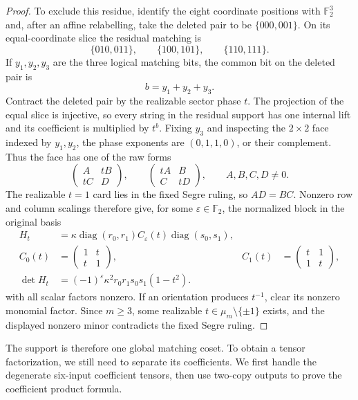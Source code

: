 \documentclass[11pt,letterpaper,onecolumn]{article}
\theoremstyle{plain}
\theoremstyle{definition}
\theoremstyle{remark}
\newcommand{\Ftwo}{\mathbb F_2}
\newcommand{\diag}{\operatorname{diag}}
\begin{document}
\begin{proof}
To exclude this residue, identify the eight coordinate positions with
\(\Ftwo^3\) and, after an affine relabelling, take the deleted pair to be
\(\{000,001\}\).  On its equal-coordinate slice the residual matching is
\[
 \{010,011\},\qquad \{100,101\},\qquad \{110,111\}.
\]
If \(y_1,y_2,y_3\) are the three logical matching bits, the common bit on
the deleted pair is
\[
 b=y_1+y_2+y_3.
\]
Contract the deleted pair by the realizable sector phase \(t\).  The projection
of the equal slice is injective, so every string in the residual support has one
internal lift and its coefficient is multiplied by \(t^b\).  Fixing
\(y_3\) and inspecting the \(2\times2\) face indexed by \(y_1,y_2\), the
phase exponents are \((0,1,1,0)\), or their complement.  Thus the face has
one of the raw forms
\[
 \begin{pmatrix}A&tB\\tC&D\end{pmatrix},
 \qquad
 \begin{pmatrix}tA&B\\C&tD\end{pmatrix},
 \qquad A,B,C,D\ne0.
\]
The realizable \(t=1\) card lies in the fixed Segre ruling, so \(AD=BC\).
Nonzero row and column scalings therefore give, for some
\(\varepsilon\in\Ftwo\), the normalized block in the original basis
\hypertarget{eq:app-nd-RM-minor}{}
\begin{equation*}
 \begin{aligned}
  H_t&=\kappa\diag(r_0,r_1)C_\varepsilon(t)\diag(s_0,s_1),\\
  C_0(t)&=\begin{pmatrix}1&t\\t&1\end{pmatrix},
  &C_1(t)&=\begin{pmatrix}t&1\\1&t\end{pmatrix},\\
  \det H_t&=(-1)^\varepsilon
      \kappa^2r_0r_1s_0s_1(1-t^2).
 \end{aligned}
\end{equation*}
with all scalar factors nonzero.  If an orientation
produces \(t^{-1}\), clear its nonzero monomial factor.  Since \(m\ge3\),
some realizable \(t\in\mu_m\setminus\{\pm1\}\) exists, and the displayed
nonzero minor contradicts the fixed Segre ruling.
\end{proof}

The support is therefore one global matching coset. To obtain a tensor
factorization, we still need to separate its coefficients. We first
handle the degenerate six-input coefficient tensors, then use two-copy
outputs to prove the coefficient product formula.
\end{document}
